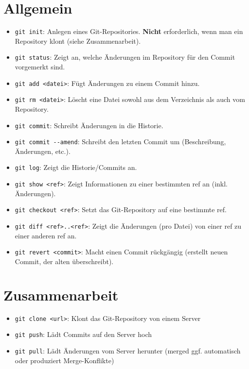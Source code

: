 \documentclass[accentcolor=tud8b,colorbacktitle,12pt]{tudexercise}
\begin{document}
\section*{Allgemein}
\begin{itemize}
	\item \lstinline|git init|: Anlegen eines Git-Repositories. \textbf{Nicht} erforderlich, wenn man ein Repository klont (siehe Zusammenarbeit).
	\item \lstinline|git status|: Zeigt an, welche Änderungen im Repository für den Commit vorgemerkt sind.
	\item \lstinline|git add <datei>|: Fügt Änderungen zu einem Commit hinzu.
	\item \lstinline|git rm <datei>|: Löscht eine Datei sowohl aus dem Verzeichnis als auch vom Repository.
	\item \lstinline|git commit|: Schreibt Änderungen in die Historie.
	\item \lstinline|git commit --amend|: Schreibt den letzten Commit um (Beschreibung, Änderungen, etc.).
	\item \lstinline|git log|: Zeigt die Historie/Commits an.
	\item \lstinline|git show <ref>|: Zeigt Informationen zu einer bestimmten ref an (inkl. Änderungen).
	\item \lstinline|git checkout <ref>|: Setzt das Git-Repository auf eine bestimmte ref.
	\item \lstinline|git diff <ref>..<ref>|: Zeigt die Änderungen (pro Datei) von einer ref zu einer anderen ref an.
	\item \lstinline|git revert <commit>|: Macht einen Commit rückgängig (erstellt neuen Commit, der alten überschreibt).
\end{itemize}

\section*{Zusammenarbeit}
\begin{itemize}
	\label{CollabClone}
	\item \lstinline|git clone <url>|: Klont das Git-Repository von einem Server
	\item \lstinline|git push|: Lädt Commits auf den Server hoch
	\item \lstinline|git pull|: Lädt Änderungen vom Server herunter (merged ggf. automatisch oder produziert Merge-Konflikte)
\end{itemize}
\end{document}
